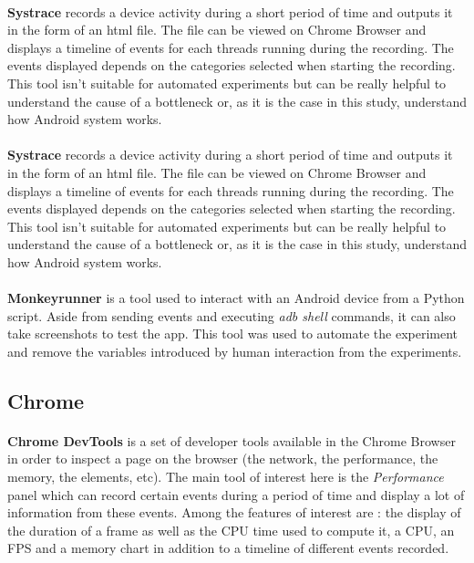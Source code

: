 \paragraph{}
\textbf{Systrace} \cite{systrace} records a device activity during a short period of time and outputs it in the form of an html file. The file can be viewed on Chrome Browser and displays a timeline of events for each threads running during the recording. The events displayed depends on the categories selected when starting the recording. This tool isn't suitable for automated experiments but can be really helpful to understand the cause of a bottleneck or, as it is the case in this study, understand how Android system works.

\paragraph{}
\textbf{Systrace} \cite{systrace} records a device activity during a short period of time and outputs it in the form of an html file. The file can be viewed on Chrome Browser and displays a timeline of events for each threads running during the recording. The events displayed depends on the categories selected when starting the recording. This tool isn't suitable for automated experiments but can be really helpful to understand the cause of a bottleneck or, as it is the case in this study, understand how Android system works.

\paragraph{}
\textbf{Monkeyrunner} \cite{monkeyrunner} is a tool used to interact with an Android device from a Python script. Aside from sending events and executing \textit{adb shell} commands, it can also take screenshots to test the app. This tool was used to automate the experiment and remove the variables introduced by human interaction from the experiments. 

\subsection{Chrome}
\paragraph{}
\textbf{Chrome DevTools} is a set of developer tools available in the Chrome Browser in order to inspect a page on the browser (the network, the performance, the memory, the elements, etc). The main tool of interest here is the \textit{Performance} panel \cite{chrome_devtools_perf} which can record certain events during a period of time and display a lot of information from these events. Among the features of interest are : the display of the duration of a frame as well as the CPU time used to compute it, a CPU, an FPS and a memory chart in addition to a timeline of different events recorded.

